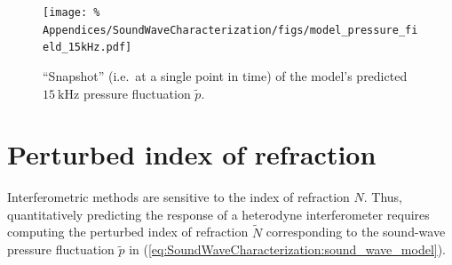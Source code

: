 \begin{figure}
  \centering
  \texttt{[image: \%
    Appendices/SoundWaveCharacterization/figs/model\_pressure\_field\_15kHz.pdf]}
  \caption[Snapshot of modeled pressure fluctuation]{%
    ``Snapshot'' (i.e.\ at a single point in time) of the model's predicted
    $\SI{15}{\kilo\hertz}$ pressure fluctuation $\widetilde{p}$.
  }
\label{fig:SoundWaveCharacterization:model_pressure_field_15kHz}
\end{figure}


\section{Perturbed index of refraction}
\label{sec:SoundWaveCharacterization:PerturbedIndexOfRefractiion}
Interferometric methods are sensitive to the index of refraction $N$.
Thus, quantitatively predicting the response of a heterodyne interferometer
requires computing the perturbed index of refraction $\tilde{N}$
corresponding to the sound-wave pressure fluctuation $\tilde{p}$
in (\ref{eq:SoundWaveCharacterization:sound_wave_model}).

